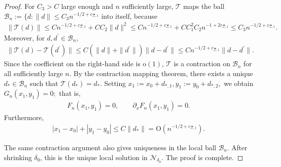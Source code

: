 \documentclass[10pt,a4paper]{amsart}
\begin{document}
\begin{proof}
	For $C_3>C$ large enough and $n$ sufficiently large, $\mathcal T$ maps the
	ball $\mathcal B_n:=\{d:\|d\|\le C_3n^{-1/2+c_{\Xi,1}}$
	into itself, because
	\begin{align*}
		\|\mathcal T(d)\|
		\le
		C n^{-1/2+c_{\Xi,1}}+CC_2\|d\|^2
		\le
		C n^{-1/2+c_{\Xi,1}}+C C_1^2 C_2 n^{-1+2c_{\Xi,1}}
		\le
		C_3n^{-1/2+c_{\Xi,1}}.
	\end{align*}
	Moreover, for $d,d^{\prime}\in\mathcal B_n$,
	\begin{align*}
		\|\mathcal T(d)-\mathcal T(d^{\prime})\|
		\le
		C(\|d\|+\|d^{\prime}\|)\|d-d^{\prime}\|
		\le
		C n^{-1/2+c_{\Xi,1}}\|d-d^{\prime}\|.
	\end{align*}
	Since the coefficient on the right-hand side is $\mathrm{o}(1)$, $\mathcal T$ is a contraction on $\mathcal B_n$ for all sufficiently large $n$. By the contraction mapping theorem, there exists a unique $d_*\in\mathcal B_n$ such that $\mathcal T(d_*)=d_*$. Setting $x_1:=x_0+d_{*,1},
	y_1:=y_0+d_{*,2},$ we obtain $G_n(x_1,y_1)=0;$ that is,
	\begin{align*}
		F_n(x_1,y_1)=0,
		\qquad
		\partial_xF_n(x_1,y_1)=0.
	\end{align*}
	Furthermore,
	\begin{align*}
		|x_1-x_0|+|y_1-y_0|
		\le C\|d_*\|
		=\mathrm{O}(n^{-1/2+c_{\Xi,1}}).
	\end{align*}
	
	The same contraction argument also gives uniqueness in the local ball $\mathcal B_n$. After shrinking $\delta_0$, this is the unique local solution in $\mathcal N_{\delta_0}$. The proof is complete.
\end{proof}
\end{document}
